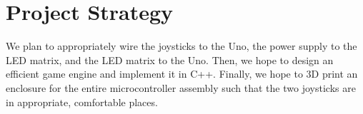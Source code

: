 \documentclass[12pt]{article}
\begin{document}
\section{Project Strategy}
    We plan to appropriately wire the joysticks to the Uno, the power supply to the LED matrix, and the LED matrix to the Uno. Then, we hope to design an efficient game engine and implement it in C++. Finally, we hope to 3D print an enclosure for the entire microcontroller assembly such that the two joysticks are in appropriate, comfortable places. 
\end{document}
